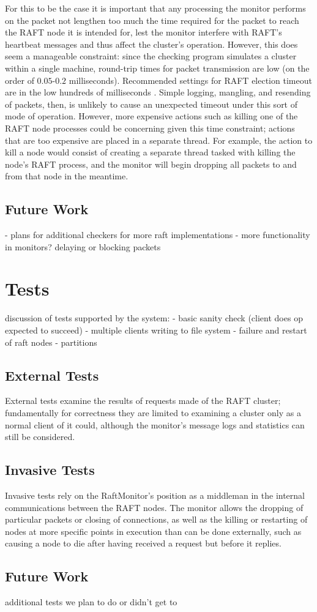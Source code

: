 \documentclass[UTF8]{article}
\begin{document}
For this to be the case it is important that any processing the monitor performs on the packet not lengthen too much the time required for the packet to reach the RAFT node it is intended for, lest the monitor interfere with RAFT's heartbeat messages and thus affect the cluster's operation. However, this does seem a manageable constraint: since the checking program simulates a cluster within a single machine, round-trip times for packet transmission are low (on the order of $0.05$-$0.2$ milliseconds). Recommended settings for RAFT election timeout are in the low hundreds of milliseconds \cite{raftPaper}. Simple logging, mangling, and resending of packets, then, is unlikely to cause an unexpected timeout under this sort of mode of operation. However, more expensive actions such as killing one of the RAFT node processes could be concerning given this time constraint; actions that are too expensive are placed in a separate thread. For example, the action to kill a node would consist of creating a separate thread tasked with killing the node's RAFT process, and the monitor will begin dropping all packets to and from that node in the meantime.

\subsection{Future Work}

- plans for additional checkers for more raft implementations
- more functionality in monitors? delaying or blocking packets

\section{Tests}

discussion of tests supported by the system:
- basic sanity check (client does op expected to succeed)
- multiple clients writing to file system
- failure and restart of raft nodes
- partitions

\subsection{External Tests}
External tests examine the results of requests made of the RAFT cluster; fundamentally for correctness they are limited to examining a cluster only as a normal client of it could, although the monitor's message logs and statistics can still be considered.

\subsection{Invasive Tests}
Invasive tests rely on the RaftMonitor's position as a middleman in the internal communications between the RAFT nodes. The monitor allows the dropping of particular packets or closing of connections, as well as the killing or restarting of nodes at more specific points in execution than can be done externally, such as causing a node to die after having received a request but before it replies.

\subsection{Future Work}

additional tests we plan to do or didn't get to




\end{document}
